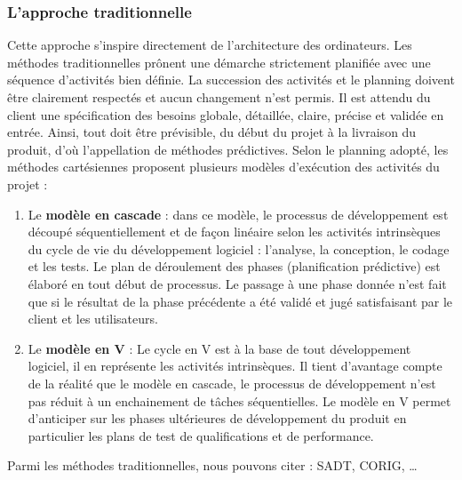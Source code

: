 \subsubsection{L'approche traditionnelle}
Cette approche s’inspire directement de l’architecture des ordinateurs. Les méthodes traditionnelles prônent une démarche strictement planifiée avec une séquence d’activités bien définie. La succession des activités et le planning doivent être clairement respectés et aucun changement n’est permis. Il est attendu du client une spécification des besoins globale, détaillée, claire, précise et validée en entrée. Ainsi, tout doit être prévisible, du début du projet à la livraison du produit, d’où l’appellation de méthodes prédictives. \newline
Selon le planning adopté, les méthodes cartésiennes proposent plusieurs modèles d’exécution des activités du projet :
\begin{enumerate}
	\item Le \textbf{modèle en cascade} : dans ce modèle, le processus de développement est découpé séquentiellement et de façon linéaire selon les activités intrinsèques du cycle de vie du développement logiciel : l’analyse, la conception, le codage et les tests. Le plan de déroulement des phases (planification prédictive) est élaboré en tout début de processus. Le passage à une phase donnée n’est fait que si le résultat de la phase précédente a été validé et jugé satisfaisant par le client et les utilisateurs.
	\item Le \textbf{modèle en V} : Le cycle en V est à la base de tout développement logiciel, il en représente les activités intrinsèques. Il tient d'avantage compte de la réalité que le modèle en cascade, le processus de développement n’est pas réduit à un enchainement de tâches séquentielles. Le modèle en V permet d’anticiper sur les phases ultérieures de développement du produit en particulier les plans de test de qualifications et de performance.
\end{enumerate}
Parmi les méthodes traditionnelles, nous pouvons citer : SADT, CORIG, …
